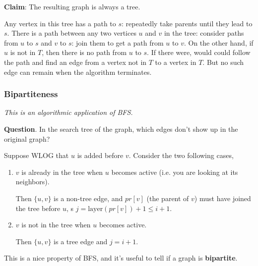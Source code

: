 \documentclass[12pt]{article}
\begin{document}
  {\bf Claim}: The resulting graph is always a tree.

  {
    Any vertex in this tree has a path to $s$: repeatedly take parents until
    they lead to $s$. There is a path between any two vertices $u$ and $v$ in
    the tree: consider paths from $u$ to $s$ and $v$ to $s$: join them to get a
    path from $u$ to $v$. On the other hand, if $u$ is not in $T$, then there is
    no path from $u$ to $s$. If there were, would could follow the path and find
    an edge from a vertex not in $T$ to a vertex in $T$. But no such edge can
    remain when the algorithm terminates.
  }

  \subsubsection{Bipartiteness}

  {\it This is an algorithmic application of BFS.}

  {\bf Question}. In the search tree of the graph, which edges don't show up in
  the original graph?



  {
    Suppose WLOG that $u$ is added before $v$. Consider the two following cases,

    \begin{enumerate}
      \item $v$ is already in the tree when $u$ becomes active (i.e. you are looking
        at its neighbors).

        Then $\{u, v\}$ is a non-tree edge, and $pr[v]$ (the parent of $v$) must
        have joined the tree before $u$, s $j = \text{layer}(pr[v]) + 1 \le i + 1$.

      \item $v$ is not in the tree when $u$ becomes active.

        Then $\{u, v\}$ is a tree edge and $j = i + 1$.
    \end{enumerate}

    This is a nice property of BFS, and it's useful to tell if a graph is {\bf
    bipartite}.
  }
\end{document}
